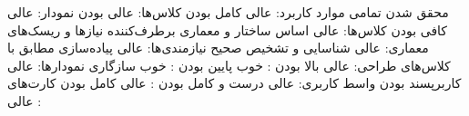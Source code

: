 
	 محقق شدن تمامی موارد کاربرد: عالی
	 کامل بودن کلاس‌ها: عالی
	  بودن نمودار: عالی
	 کافی بودن کلاس‌ها: عالی
	 اساس ساختار و معماری برطرف‌کننده نیاز‌ها و ریسک‌های معماری: عالی
	 شناسایی و تشخیص صحیح نیازمندی‌ها: عالی
	 پیاده‌سازی مطابق با کلاس‌های طراحی: عالی
	 بالا بودن : خوب
	 پایین بودن : خوب
	 سازگاری نمودارها:‌ عالی
	 کاربرپسند بودن واسط کاربری: عالی
	 درست و کامل بودن : عالی
	 کامل بودن کارت‌های : عالی
	
